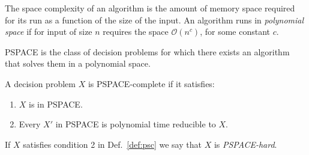The space complexity of an algorithm is the amount of memory space required for its run as a function of the size of the input.
An algorithm runs in \emph{polynomial space} if for input of size $n$ requires the space $\mathcal{O}(n^c)$, for some constant $c$.
\begin{definition}
	PSPACE is the class of decision problems for which there exists an algorithm that solves them in a polynomial space.
\end{definition}
\begin{definition}\label{def:psc}
	A decision problem $X$ is PSPACE-complete if it satisfies:
	\begin{enumerate}
		\item $X$ is in PSPACE.
		\item Every $X'$ in PSPACE is polynomial time reducible to $X$.
	\end{enumerate}
\end{definition}
If $X$ satisfies condition 2 in Def.~\ref{def:psc} we say that $X$ is \emph{PSPACE-hard}.

